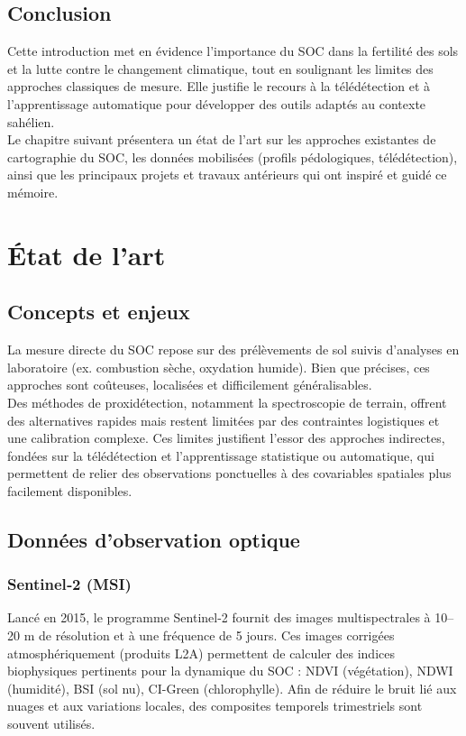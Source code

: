 \documentclass[12pt,a4paper,oneside]{report}
\begin{document}
\section{Conclusion}
Cette introduction met en évidence l’importance du SOC dans la fertilité des sols et la lutte contre le changement climatique, tout en soulignant les limites des approches classiques de mesure. Elle justifie le recours à la télédétection et à l’apprentissage automatique pour développer des outils adaptés au contexte sahélien.\\
\newline
Le chapitre suivant présentera un état de l’art sur les approches existantes de cartographie du SOC, les données mobilisées (profils pédologiques, télédétection), ainsi que les principaux projets et travaux antérieurs qui ont inspiré et guidé ce mémoire.



\chapter{État de l’art}

\section{Concepts et enjeux}
La mesure directe du SOC repose sur des prélèvements de sol suivis d’analyses en laboratoire (ex. combustion sèche, oxydation humide). Bien que précises, ces approches sont coûteuses, localisées et difficilement généralisables.
\\
\newline
Des méthodes de proxidétection, notamment la spectroscopie de terrain, offrent des alternatives rapides mais restent limitées par des contraintes logistiques et une calibration complexe. Ces limites justifient l’essor des approches indirectes, fondées sur la télédétection et l’apprentissage statistique ou automatique, qui permettent de relier des observations ponctuelles à des covariables spatiales plus facilement disponibles.

\section{Données d’observation optique}
\subsection{Sentinel‑2 (MSI)}
Lancé en 2015, le programme Sentinel-2 \cite{sentinel2} fournit des images multispectrales à 10–20 m de résolution et à une fréquence de 5 jours. Ces images corrigées atmosphériquement (produits L2A) permettent de calculer des indices biophysiques pertinents pour la dynamique du SOC : NDVI (végétation), NDWI (humidité), BSI (sol nu), CI-Green (chlorophylle). Afin de réduire le bruit lié aux nuages et aux variations locales, des composites temporels trimestriels sont souvent utilisés.
\end{document}
